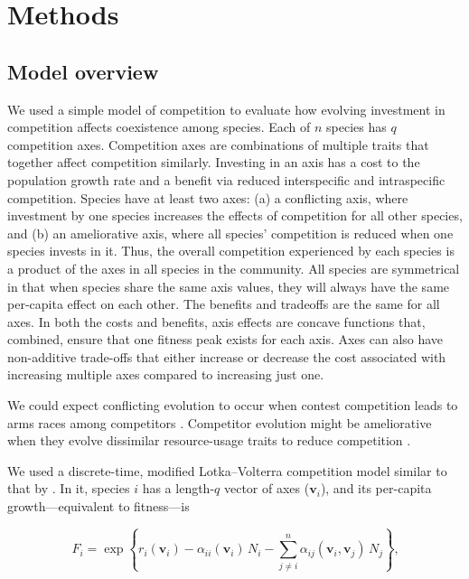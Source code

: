 
\section*{Methods}


\subsection*{Model overview}

We used a simple model of competition to evaluate how evolving investment in 
competition affects coexistence among species.
Each of $n$ species has $q$ competition axes.
Competition axes are combinations of multiple traits that together affect 
competition similarly.
Investing in an axis has a cost to the population growth rate and 
a benefit via reduced interspecific and intraspecific competition.
Species have at least two axes:
(a) a conflicting axis, where investment by one species increases the 
effects of competition for all other species, and
(b) an ameliorative axis, where all species' competition is reduced when
one species invests in it.
Thus, the overall competition experienced by each species is a product of 
the axes in all species in the community.
All species are symmetrical in that when species share the same axis 
values, they will always have the same per-capita effect on each other.
The benefits and tradeoffs are the same for all axes.
In both the costs and benefits, axis effects are concave functions that,
combined, ensure that one fitness peak exists for each axis.
Axes can also have non-additive trade-offs that either increase or decrease
the cost associated with increasing multiple axes compared to increasing
just one.

We could expect conflicting evolution to occur when contest competition
leads to arms races among competitors
\citep{Abrams:1994th}.
Competitor evolution might be ameliorative when they evolve
dissimilar resource-usage traits to reduce competition \citep{Roughgarden:1976eh}.


We used a discrete-time, modified Lotka--Volterra competition model similar to
that by \citet{Northfield:2013if}.
In it, species $i$ has a length-$q$ vector of axes ($\mathbf{v}_i$), and
its per-capita growth---equivalent to fitness---is

\begin{equation} \label{eq:fitness}
    F_{i} = \exp \left\{ r_i(\mathbf{v}_i) - 
        \alpha_{ii}(\mathbf{v}_i) \, N_i - \sum_{j \ne i}^{n}{
            \alpha_{ij}(\mathbf{v}_i, \mathbf{v}_j) \, N_j}  
    \right\}\textrm{,}
\end{equation}

